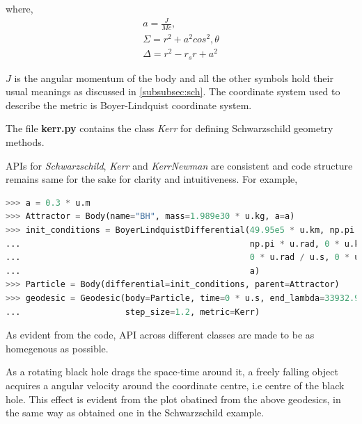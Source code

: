 \documentclass{aastex63}
\begin{document}
where,
\begin{gather}
a = \frac{J}{Mc}, \nonumber \\
\Sigma = r^2 + a^2 cos^2, \nonumber \theta \\
\Delta  = r^2 - r_s r + a^2 \nonumber
\end{gather}

$J$ is the angular momentum of the body and all the other symbols hold their usual meanings as discussed in \ref{subsubsec:sch}. The coordinate system used to describe the metric is Boyer-Lindquist coordinate system.

The file \textbf{kerr.py} contains the class \textit{Kerr} for defining Schwarzschild geometry methods.

APIs for \textit{Schwarzschild}, \textit{Kerr} and \textit{KerrNewman} are consistent and code structure remains same for the sake for clarity and intuitiveness. For example,

\begin{lstlisting}[language=Python, caption=Defining the Kerr Body and the particle and calculating geodesics]
>>> a = 0.3 * u.m
>>> Attractor = Body(name="BH", mass=1.989e30 * u.kg, a=a)
>>> init_conditions = BoyerLindquistDifferential(49.95e5 * u.km, np.pi / 2 * u.rad, 
...                                              np.pi * u.rad, 0 * u.km / u.s, 
...                                              0 * u.rad / u.s, 0 * u.rad / u.s,
...                                              a)
>>> Particle = Body(differential=init_conditions, parent=Attractor)
>>> geodesic = Geodesic(body=Particle, time=0 * u.s, end_lambda=33932.90,
...                     step_size=1.2, metric=Kerr)
\end{lstlisting}

As evident from the code, API across different classes are made to be as homegenous as possible.

As a rotating black hole drags the space-time around it, a freely falling object acquires a angular velocity around the coordinate centre, i.e centre of the black hole. This effect is evident from the plot obatined from the above geodesics, in the same way as obtained one in the Schwarzschild example.
\end{document}
